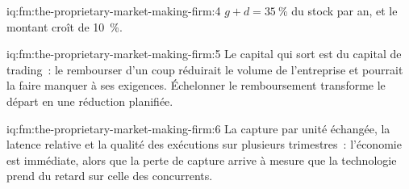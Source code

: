 \begin{solution}{iq:fm:the-proprietary-market-making-firm:4}
$g+d=35~\%$ du stock par an, et le montant croît de 10~\%.
\end{solution}

\begin{solution}{iq:fm:the-proprietary-market-making-firm:5}
Le capital qui sort est du capital de trading~: le rembourser d'un coup réduirait le volume de l'entreprise et pourrait la faire manquer à ses exigences. Échelonner le remboursement transforme le
départ en une réduction planifiée.
\end{solution}

\begin{solution}{iq:fm:the-proprietary-market-making-firm:6}
La capture par unité échangée, la latence relative et la qualité des exécutions sur plusieurs trimestres~: l'économie est immédiate, alors que la perte de capture arrive à mesure que la
technologie prend du retard sur celle des concurrents.
\end{solution}
